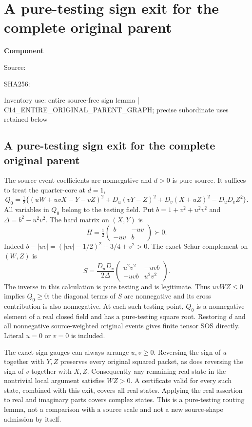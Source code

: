 \chapter{A pure-testing sign exit for the complete original parent}
\label{component:p894ae380fb8a}
\noindent\textbf{Component }\par
{\small\noindent Source: \par}
{\small\noindent SHA256: \par}
{\small\noindent Inventory use: entire source-free sign lemma | C14\_\allowbreak{}ENTIRE\_\allowbreak{}ORIGINAL\_\allowbreak{}PARENT\_\allowbreak{}GRAPH; precise subordinate uses retained below\par}
\medskip
\section{A pure-testing sign exit for the complete original parent}
The source event coefficients are nonnegative and $d>0$ is pure source.
It suffices to treat the quarter-core at $d=1$,
\[
 Q_0=\tfrac12\{(uW+uvX-Y-vZ)^2+D_u(vY-Z)^2
                   +D_v(X+uZ)^2-D_uD_vZ^2\}.
\]
All variables in $Q_0$ belong to the testing field. Put
$b=1+v^2+u^2v^2$ and $\Delta=b^2-u^2v^2$.
The hard matrix on $(X,Y)$ is
\[
 H=\tfrac12\begin{pmatrix}b&-uv\\-uv&b\end{pmatrix}\succ0.
\]
Indeed $b-|uv|=(|uv|-1/2)^2+3/4+v^2>0$.
The exact Schur complement on $(W,Z)$ is
\[
 S=\frac{D_uD_v}{2\Delta}
 \begin{pmatrix}u^2v^2&-uvb\\-uvb&u^2v^2\end{pmatrix}.
\]
The inverse in this calculation is pure testing and is legitimate.
Thus $uvWZ\le0$ implies $Q_0\ge0$: the diagonal terms of $S$
are nonnegative and its cross contribution is also nonnegative.
At each such testing point, $Q_0$ is a nonnegative element of a real
closed field and has a pure-testing square root. Restoring $d$ and
all nonnegative source-weighted original events gives finite tensor
SOS directly. Literal $u=0$ or $v=0$ is included.

The exact sign gauges can always arrange $u,v\ge0$. Reversing the
sign of $u$ together with $Y,Z$ preserves every original squared
packet, as does reversing the sign of $v$ together with $X,Z$.
Consequently any remaining real state in the nontrivial local
argument satisfies $WZ>0$. A certificate valid for every such state,
combined with this exit, covers all real states. Applying the real
assertion to real and imaginary parts covers complex states.
This is a pure-testing routing lemma, not a comparison with a source
scale and not a new source-shape admission by itself.
